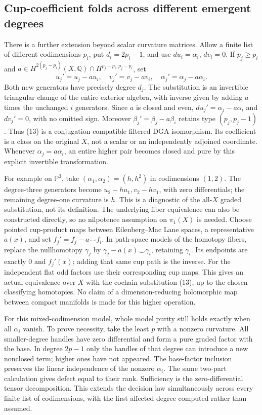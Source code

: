 \documentclass[11pt]{article}
\newcommand{\Q}{\mathbb Q}
\begin{document}
\subsection{Cup-coefficient folds across different emergent degrees}
There is a further extension beyond scalar curvature matrices. Allow a
finite list of different codimensions $p_i$, put $d_i=2p_i-1$, and use
$du_i=\alpha_i$, $dv_i=0$. If $p_j\geq p_i$ and
$a\in H^{2(p_j-p_i)}(X,\Q)\cap H^{p_j-p_i,p_j-p_i}$, set
\[
 u_j'=u_j-a u_i,\quad v_j'=v_j-a v_i,\quad
 \alpha_j'=\alpha_j-a\alpha_i.                                       \tag{13}
\]
Both new generators have precisely degree $d_j$. The substitution is an
invertible triangular change of the entire exterior algebra, with inverse
given by adding $a$ times the unchanged $i$ generators. Since $a$ is closed
and even, $du_j'=\alpha_j-a\alpha_i$ and $dv_j'=0$, with no omitted sign.
Moreover $\beta_j'=\beta_j-a\beta_i$ retains type $(p_j,p_j-1)$.
Thus (13) is a conjugation-compatible filtered DGA isomorphism. Its
coefficient is a class on the original $X$, not a scalar or an independently
adjoined coordinate. Whenever $\alpha_j=a\alpha_i$, an entire higher pair
becomes closed and pure by this explicit invertible transformation.

For example on $\mathbb P^3$, take $(\alpha_1,\alpha_2)=(h,h^2)$ in
codimensions $(1,2)$. The degree-three generators become
$u_2-hu_1,v_2-hv_1$, with zero differentials; the remaining degree-one
curvature is $h$. This is a diagnostic of the all-$X$ graded substitution,
not its definition. The underlying fiber equivalence can also be constructed
directly, so no nilpotence assumption on $\pi_1(X)$ is needed. Choose pointed
cup-product maps between Eilenberg--Mac Lane spaces, a representative
$a(x)$, and set $f_j'=f_j-a\smile f_i$. In path-space models of the homotopy
fibers, replace the nullhomotopy $\gamma_j$ by
$\gamma_j-a(x)\smile\gamma_i$, retaining $\gamma_i$. Its endpoints are
exactly $0$ and $f_j'(x)$; adding that same cup path is the inverse. For the
independent flat odd factors use their corresponding cup maps. This gives
an actual equivalence over $X$ with the cochain substitution (13), up to
the chosen classifying homotopies. No claim of a dimension-reducing
holomorphic map between compact manifolds is made for this higher operation.

For this mixed-codimension model, whole model purity still holds exactly
when all $\alpha_i$ vanish. To prove necessity, take the least $p$ with a
nonzero curvature. All smaller-degree handles have zero differential and
form a pure graded factor with the base. In degree $2p-1$ only the handles
of that degree can introduce a new nonclosed term; higher ones have not
appeared. The base-factor inclusion preserves the linear independence of
the nonzero $\alpha_i$. The same two-part calculation gives defect equal
to their rank. Sufficiency is the zero-differential tensor decomposition.
This extends the decision law simultaneously across every finite list of
codimensions, with the first affected degree computed rather than assumed.
\end{document}
